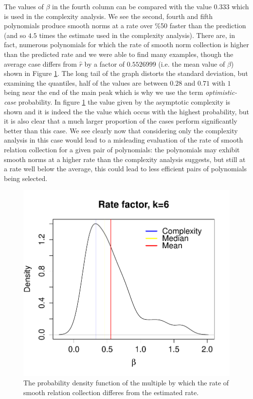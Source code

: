\documentclass[a4paper, 10pt, envcountsect, runningheads]{lms}
\numberwithin{figure}{section}
\numberwithin{equation}{section}
\begin{document}
The values of $\beta$ in the fourth column can be compared with the value $0.33\hat{3}$ which is used in the complexity analysis. We see the second, fourth and fifth polynomials produce smooth norms at a rate over \%50 faster than the prediction (and so $4.5$ times the estimate used in the complexity analysis). There are, in fact, numerous polynomials for which the rate of smooth norm collection is higher than the predicted rate and we were able to find many examples, though the average case differs from $\hat{r}$ by a factor of $0.5526999$ (i.e. the mean value of $\beta$) shown in Figure \ref{fig:mults}. The long tail of the graph distorts the standard deviation, but examining the quantiles, half of the values are between $0.28$ and $0.71$ with $1$ being near the end of the main peak which is why we use the term {\em optimistic-case} probability. In figure \ref{fig:mults} the value given by the asymptotic complexity is shown and it is indeed the the value which occus with the highest probability, but it is also clear that a much larger proportion of the cases perform significantly better than this case. We see clearly now that considering only the complexity analysis in this case would lead to a misleading evaluation of the rate of smooth relation collection for a given pair of polynomials: the polynomials may exhibit smooth norms at a higher rate than the complexity analysis suggests, but still at a rate well below the average, this could lead to less efficient pairs of polynomials being selected.

\begin{center}
\begin{figure}\label{fig:mults}
\includegraphics[scale=0.80]{graphs/multiple_tests_plot}\caption{The probability density function of the multiple by which the rate of smooth relation collection differes from the estimated rate.}
\end{figure}
\end{center}
\end{document}
